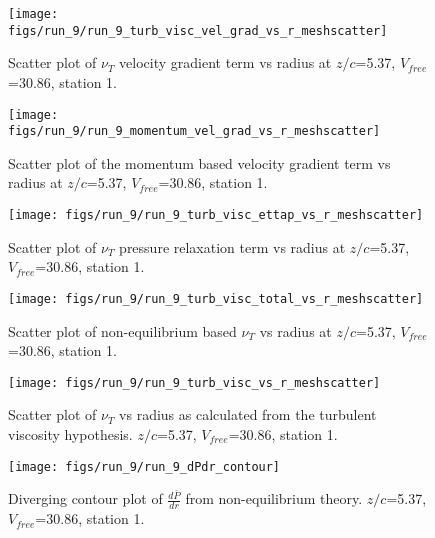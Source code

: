 \begin{figure}[H]
\centering
\texttt{[image: figs/run\_9/run\_9\_turb\_visc\_vel\_grad\_vs\_r\_meshscatter]}
\caption{Scatter plot of $\nu_T$ velocity gradient term vs radius at $z/c$=5.37, $V_{free}$=30.86, station 1.}
\end{figure}


\begin{figure}[H]
\centering
\texttt{[image: figs/run\_9/run\_9\_momentum\_vel\_grad\_vs\_r\_meshscatter]}
\caption{Scatter plot of the momentum based velocity gradient term vs radius at $z/c$=5.37, $V_{free}$=30.86, station 1.}
\end{figure}


\begin{figure}[H]
\centering
\texttt{[image: figs/run\_9/run\_9\_turb\_visc\_ettap\_vs\_r\_meshscatter]}
\caption{Scatter plot of $\nu_T$ pressure relaxation term vs radius at $z/c$=5.37, $V_{free}$=30.86, station 1.}
\end{figure}


\begin{figure}[H]
\centering
\texttt{[image: figs/run\_9/run\_9\_turb\_visc\_total\_vs\_r\_meshscatter]}
\caption{Scatter plot of non-equilibrium based $\nu_T$ vs radius at $z/c$=5.37, $V_{free}$=30.86, station 1.}
\end{figure}


\begin{figure}[H]
\centering
\texttt{[image: figs/run\_9/run\_9\_turb\_visc\_vs\_r\_meshscatter]}
\caption{Scatter plot of $\nu_T$ vs radius as calculated from the turbulent viscosity hypothesis. $z/c$=5.37, $V_{free}$=30.86, station 1.}
\end{figure}


\begin{figure}[H]
\centering
\texttt{[image: figs/run\_9/run\_9\_dPdr\_contour]}
\caption{Diverging contour plot of $\frac{d\bar{P}}{dr}$ from non-equilibrium theory. $z/c$=5.37, $V_{free}$=30.86, station 1.}
\end{figure}


